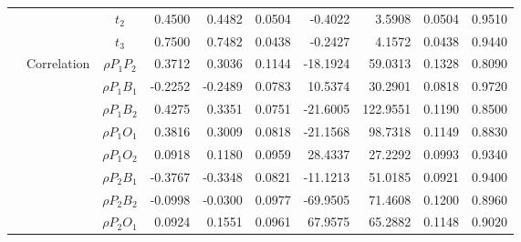 \documentclass[letterpaper]{article}
\begin{document}
\begin{table}[h]
\begin{tabular}{cccrrrrrrr}
            &             & $t_2$          & 0.4500                 & 0.4482                 & 0.0504                 & -0.4022                & 3.5908                 & 0.0504                   & 0.9510                 \\
            &             & $t_3$          & 0.7500                 & 0.7482                 & 0.0438                 & -0.2427                & 4.1572                 & 0.0438                   & 0.9440                 \\
            & Correlation & $\rho{P_1P_2}$ & 0.3712                 & 0.3036                 & 0.1144                 & -18.1924               & 59.0313                & 0.1328                   & 0.8090                 \\
            &             & $\rho{P_1B_1}$ & -0.2252                & -0.2489                & 0.0783                 & 10.5374                & 30.2901                & 0.0818                   & 0.9720                 \\
            &             & $\rho{P_1B_2}$ & 0.4275                 & 0.3351                 & 0.0751                 & -21.6005               & 122.9551               & 0.1190                   & 0.8500                 \\
            &             & $\rho{P_1O_1}$ & 0.3816                 & 0.3009                 & 0.0818                 & -21.1568               & 98.7318                & 0.1149                   & 0.8830                 \\
            &             & $\rho{P_1O_2}$ & 0.0918                 & 0.1180                 & 0.0959                 & 28.4337                & 27.2292                & 0.0993                   & 0.9340                 \\
            &             & $\rho{P_2B_1}$ & -0.3767                & -0.3348                & 0.0821                 & -11.1213               & 51.0185                & 0.0921                   & 0.9400                 \\
            &             & $\rho{P_2B_2}$ & -0.0998                & -0.0300                & 0.0977                 & -69.9505               & 71.4608                & 0.1200                   & 0.8960                 \\
            &             & $\rho{P_2O_1}$ & 0.0924                 & 0.1551                 & 0.0961                 & 67.9575                & 65.2882                & 0.1148                   & 0.9020                 \\

\end{tabular}
\end{table}
\end{document}
